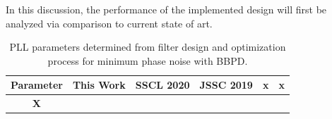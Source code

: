 In this discussion, the performance of the implemented design will first be analyzed via comparison to current state of art.


	\begin{table}[h!]
		\centering
		\def\arraystretch{1.5}		
		\setlength\arrayrulewidth{0.75pt}
		\setlength{\tabcolsep}{1em} %
		\begin{tabular}{|c|c|c|c|c|c|}
			\hline 
			\rule[-1ex]{0pt}{2.5ex} \cellcolor{gray!40}\textbf{Parameter} & \cellcolor{gray!40}\textbf{This Work} & \cellcolor{gray!40}\textbf{SSCL 2020}\cite{Liu2020} & \cellcolor{gray!40}\textbf{JSSC 2019}\cite{Liu2019} & \cellcolor{gray!40}\textbf{x} & \cellcolor{gray!40}\textbf{x}\\ 
			\hline 
			\rule[-1ex]{0pt}{2.5ex} \textbf{X} & & & & & \\
			\hline 
		\end{tabular} 
		\caption{PLL parameters determined from filter design and optimization process for minimum phase noise with BBPD.}
		\label{tab:state_of_art}
	\end{table}  

